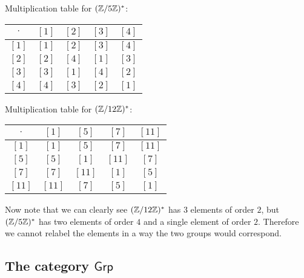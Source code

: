 \begin{solution}
	Multiplication table for $(\mathbb{Z}/5\mathbb{Z})^*$:
	
	\begin{center}
		\renewcommand{\arraystretch}{1.3}
		\begin{tabular}{c||c|c|c|c}
			$\cdot$ & $[1]$ & $[2]$ & $[3]$ & $[4]$ \\
			\hline\hline
			$[1]$ & $[1]$ & $[2]$ & $[3]$ & $[4]$ \\ 
			\hline
			$[2]$ & $[2]$ & $[4]$ & $[1]$ & $[3]$ \\ 
			\hline
			$[3]$ & $[3]$ & $[1]$ & $[4]$ & $[2]$ \\ 
			\hline
			$[4]$ & $[4]$ & $[3]$ & $[2]$ & $[1]$ \\ 
		\end{tabular}
	\end{center}

	Multiplication table for $(\mathbb{Z}/12\mathbb{Z})^*$:
	
	\begin{center}
		\renewcommand{\arraystretch}{1.3}
		\begin{tabular}{c||c|c|c|c}
			$\cdot$ & $[1]$ & $[5]$ & $[7]$ & $[11]$ \\
			\hline\hline
			$[1]$ & $[1]$ & $[5]$ & $[7]$ & $[11]$ \\ 
			\hline
			$[5]$ & $[5]$ & $[1]$ & $[11]$ & $[7]$ \\ 
			\hline
			$[7]$ & $[7]$ & $[11]$ & $[1]$ & $[5]$ \\ 
			\hline
			$[11]$ & $[11]$ & $[7]$ & $[5]$ & $[1]$ \\ 
		\end{tabular}
	\end{center}

	Now note that we can clearly see $(\mathbb{Z}/12\mathbb{Z})^*$ has $3$ elements of order $2$, but $(\mathbb{Z}/5\mathbb{Z})^*$ has two elements of order $4$ and a single element of order $2$. Therefore we cannot relabel the elements in a way the two groups would correspond.
\end{solution}

\subsection{The category $\mathsf{Grp}$}

\begin{problem}
\end{problem}

